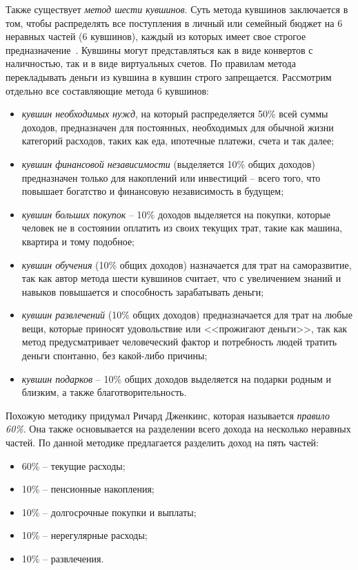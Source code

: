 Также существует \emph{метод шести кувшинов}.
Суть метода кувшинов заключается в том, чтобы распределять все поступления в личный или семейный бюджет на 6 неравных частей (6 кувшинов), каждый из которых имеет свое строгое предназначение~\cite{six_jugs}.
Кувшины могут представляться как в виде конвертов с наличностью, так и в виде виртуальных счетов.
По правилам метода перекладывать деньги из кувшина в кувшин строго запрещается.
Рассмотрим отдельно все составляющие метода 6 кувшинов:
\begin{itemize}
    \item \emph{кувшин необходимых нужд}, на который распределяется 50\% всей суммы доходов, предназначен для постоянных, необходимых для обычной жизни категорий расходов, таких как еда, ипотечные платежи, счета и так далее;
    \item \emph{кувшин финансовой независимости} (выделяется 10\% общих доходов) предназначен только для накоплений или инвестиций -- всего того, что повышает богатство и финансовую независимость в будущем;
    \item \emph{кувшин больших покупок} -- 10\% доходов выделяется на покупки, которые человек не в состоянии оплатить из своих текущих трат, такие как машина, квартира и тому подобное;
    \item \emph{кувшин обучения} (10\% общих доходов) назначается для трат на саморазвитие, так как автор метода шести кувшинов считает, что с увеличением знаний и навыков повышается и способность зарабатывать деньги;
    \item \emph{кувшин развлечений} (10\% общих доходов) предназначается для трат на любые вещи, которые приносят удовольствие или <<прожигают деньги>>, так как метод предусматривает человеческий фактор и потребность людей тратить деньги спонтанно, без какой-либо причины;
    \item \emph{кувшин подарков} -- 10\% общих доходов выделяется на подарки родным и близким, а также благотворительность.
\end{itemize}

Похожую методику придумал Ричард Дженкинс, которая называется \emph{правило 60\%}.
Она также основывается на разделении всего дохода на несколько неравных частей.
По данной методике предлагается разделить доход на пять частей:
\begin{itemize}
    \item 60\% -- текущие расходы;
    \item 10\% -- пенсионные накопления;
    \item 10\% -- долгосрочные покупки и выплаты;
    \item 10\% -- нерегулярные расходы;
    \item 10\% -- развлечения.
\end{itemize}

